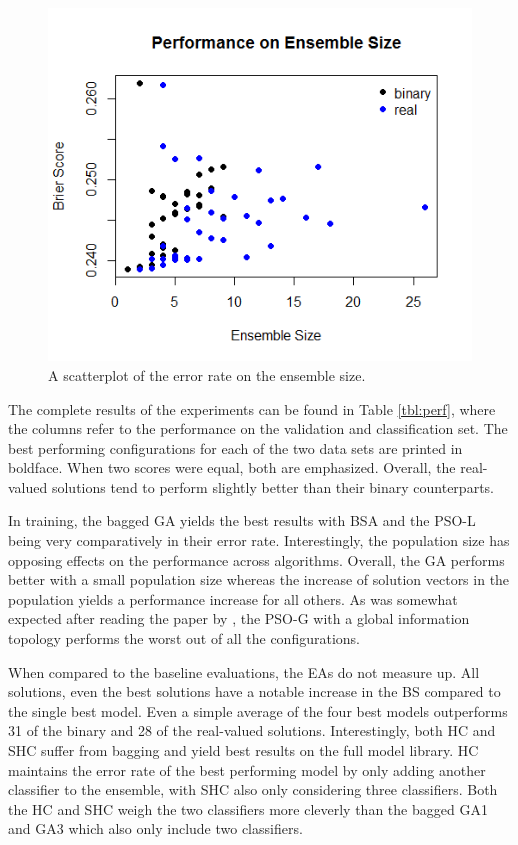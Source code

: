 \begin{figure}[ht]
	\begin{center}
		\includegraphics[scale=0.8]{Perform_size}
		\caption{A scatterplot of the error rate on the ensemble size.}
		\label{fig:perfsize}
	\end{center}
\end{figure}

The complete results of the experiments can be found in Table \ref{tbl:perf}, where the columns refer to the performance on the validation and classification set. The best performing configurations for each of the two data sets are printed in boldface. When two scores were equal, both are emphasized. Overall, the real-valued solutions tend to perform slightly better than their binary counterparts. 
 
In training, the bagged GA yields the best results with BSA and the PSO-L being very comparatively in their error rate. Interestingly, the population size has opposing effects on the performance across algorithms. Overall, the GA performs better with a small population size whereas the increase of solution vectors in the population yields a performance increase for all others. As was somewhat expected after reading the paper by \cite{kennedymendes}, the PSO-G with a global information topology performs the worst out of all the configurations.

When compared to the baseline evaluations, the EAs do not measure up. All solutions, even the best solutions have a notable increase in the BS compared to the single best model. Even a simple average of the four best models outperforms 31 of the binary and 28 of the real-valued solutions. Interestingly, both HC and SHC suffer from bagging and yield best results on the full model library. HC maintains the error rate of the best performing model by only adding another classifier to the ensemble, with SHC also only considering three classifiers. Both the HC and SHC weigh the two classifiers more cleverly than the bagged GA1 and GA3 which also only include two classifiers.%

